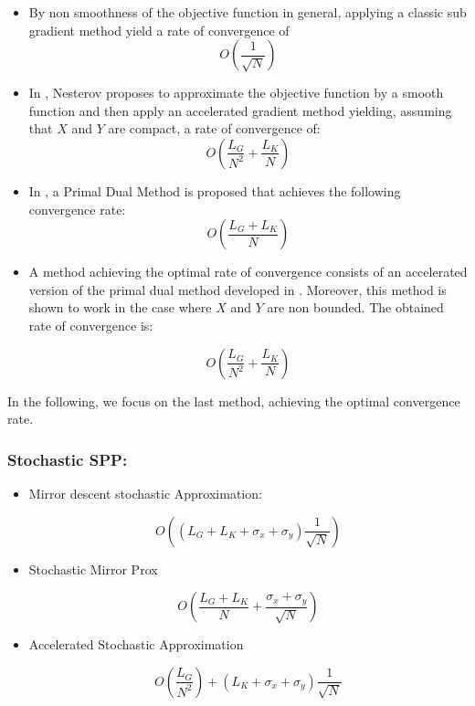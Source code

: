 \documentclass[12pt,reqno]{amsart}
\numberwithin{equation}{section}
\begin{document}
\begin{itemize}

\item By non smoothness of the objective function in general, applying a classic sub gradient method \cite{YudinNemirovski} yield a rate of convergence of
$$
O(\dfrac{1}{\sqrt{N}})
$$

\item In \cite{Nesterov}, Nesterov proposes to approximate the objective function by a smooth function and then apply an accelerated gradient method yielding, assuming that $X$ and $Y$ are compact, a rate of convergence of:
$$
O(\dfrac{L_{G}}{N^2} + \dfrac{L_{K}}{N})
$$

\item In \cite{ChambollePock}, a Primal Dual Method is proposed that achieves the following convergence rate:
$$
O(\dfrac{L_{G} + L_{K}}{N})
$$
\item A method achieving the optimal rate of convergence consists of an accelerated version of the primal dual method developed in \cite{ChenLanOuyang}.
Moreover, this method is shown to work in the case where $X$ and $Y$ are non bounded.
The obtained rate of convergence is:

$$
O(\dfrac{L_{G}}{N^2} + \dfrac{L_{K}}{N})
$$


\end{itemize}

In the following, we focus on the last method, achieving the optimal convergence rate.

%




\subsubsection{ Stochastic SPP: }
\begin{itemize}
\item Mirror descent stochastic Approximation:

$$
O((L_{G} + L_{K} + \sigma_{x} + \sigma_{y})\dfrac{1}{\sqrt{N}})
$$

\item Stochastic Mirror Prox

$$
O(\dfrac{L_{G} + L_{K}}{N} + \dfrac{\sigma_{x} + \sigma_{y}}{\sqrt{N}})
$$

\item Accelerated Stochastic Approximation

$$
O(\dfrac{L_{G}}{N^{2}}) + (L_{K} + \sigma_{x} + \sigma_{y})\dfrac{1}{\sqrt{N}}
$$
\end{itemize}
\end{document}
